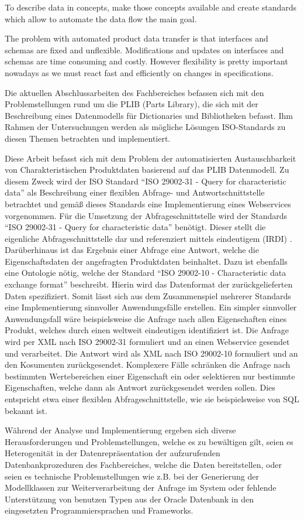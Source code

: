 To describe data in concepts, make those concepts available and create standards which allow to automate the data flow the main goal.  

The problem with automated product data transfer is that interfaces and schemas are fixed and unflexible. Modifications and updates on interfaces and schemas are time consuming and costly. However flexibility is pretty important nowadays as we must react fast and efficiently on changes in specifications. 
 
 
Die aktuellen Abschlussarbeiten des Fachbereiches befassen sich mit den Problemstellungen rund um die \gls{PLIB} (Parts Library), die sich mit der Beschreibung eines Datenmodells für Dictionaries und Bibliotheken befasst. Ihm Rahmen der Untersuchungen werden als mögliche Lösungen ISO-Standards zu diesen Themen betrachten und implementiert. 

Diese Arbeit befasst sich mit dem Problem der automatisierten Austauschbarkeit von Charakteristischen Produktdaten basierend auf das PLIB Datenmodell. Zu diesem Zweck wird der ISO Standard \enquote{ISO 29002-31 - Query for characteristic data} als Beschreibung einer flexiblen Abfrage- und Antwortschnittstelle betrachtet und gemäß dieses Standards eine Implementierung eines \glspl{Webservice} vorgenommen. 
Für die Umsetzung der Abfrageschnittstelle wird der Standards \enquote{ISO 29002-31 - Query for characteristic data} benötigt. Dieser stellt die eigenliche Abfrageschnittstelle dar und referenziert mittels eindeutigem  (IRDI) . Darüberhinaus ist das Ergebnis einer Abfrage eine Antwort, welche die Eigenschaftsdaten der angefragten Produktdaten beinhaltet. Dazu ist ebenfalls eine Ontologie nötig, welche der Standard \enquote{ISO 29002-10 - Characteristic data exchange format} beschreibt. Hierin wird das Datenformat der zurückgelieferten Daten spezifiziert. Somit lässt sich aus dem Zusammenspiel mehrerer Standards eine Implementierung sinnvoller Anwendungsfälle erstellen. 
Ein simpler sinnvoller Anwendungsfall wäre beispielsweise die Anfrage nach allen Eigenschaften eines Produkt, welches durch einen weltweit eindeutigen  identifiziert ist. Die Anfrage wird per XML nach ISO 29002-31 formuliert und an einen \gls{Webservice} gesendet und verarbeitet. Die Antwort wird als XML nach ISO 29002-10 formuliert und an den Kosumenten zurückgesendet. Komplexere Fälle schränken die Anfrage nach bestimmten Wertebereichen einer Eigenschaft ein oder selektieren nur bestimmte Eigenschaften, welche dann als Antwort zurückgesendet werden sollen. Dies entspricht etwa einer flexiblen Abfrageschnittstelle, wie sie beispielsweise von SQL bekannt ist.  

Während der Analyse und Implementierung ergeben sich diverse Herausforderungen und Problemstellungen, welche es zu bewältigen gilt, seien es Heterogenität in der Datenrepräsentation der aufzurufenden Datenbankprozeduren des Fachbereiches, welche die Daten bereitstellen, oder seien es technische Problemstellungen wie z.B. bei der Generierung der Modellklassen zur Weiterverarbeitung der Anfrage im System oder fehlende Unterstützung von benutzen Typen aus der Oracle Datenbank in den eingesetzten Programmiersprachen und Frameworks.  
